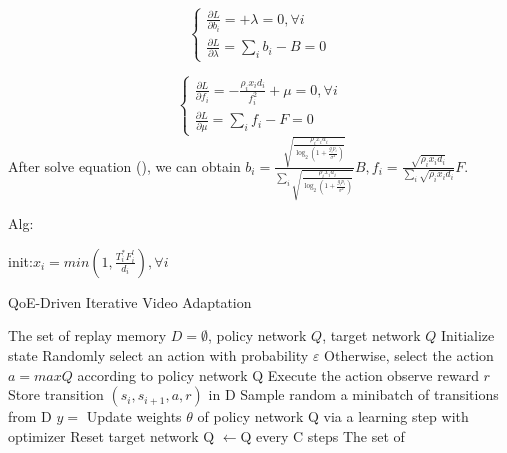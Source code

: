 \documentclass{article}
\begin{document}
\begin{equation}
	\left\{
	\begin{array}{ll}   
	\frac{\partial L}{\partial b_{i}} =  + \lambda = 0, \forall i \\
    \frac{\partial L}{\partial \lambda} = \sum_{i}b_{i} - B = 0
	\end{array}
\right.
\end{equation}

\begin{equation}
	\left\{
	\begin{array}{ll}   
	\frac{\partial L}{\partial f_{i}} = -\frac{\rho_{i}x_{i}d_{i}}{f_{i}^{2}} + \mu = 0, \forall i \\
    \frac{\partial L}{\partial \mu} = \sum_{i}f_{i} - F = 0
	\end{array}
\right.
\end{equation}
After solve equation (), we can obtain $b_{i}=\frac{\sqrt{\frac{\rho_{i}x_{i}a_{i}}{\log_{2}{ (1+\frac{g_{i}p_{i}}{ \sigma^{2} } )} }}}{\sum_{i}\sqrt{\frac{\rho_{i}x_{i}a_{i}}{\log_{2}{ (1+\frac{g_{i}p_{i}}{ \sigma^{2} } )} }}}B, f_{i}=\frac{ \sqrt{ \rho_{i}x_{i}d_{i}} } { \sum_{i}\sqrt{\rho_{i}x_{i}d_{i}} }F$.

Alg:

init:$x_{i}= min(1,\frac{T^{*}_{i}F_{i}^{l}}{d_{i}}), \forall i$

\begin{algorithm}[t]
  \renewcommand{\algorithmicrequire}{\textbf{Input:}}
  \renewcommand{\algorithmicensure}{\textbf{Initialization:}}
  \small
  \caption{QoE-Driven Iterative Video Adaptation}
  \label{alg:intra_place}
  \begin{algorithmic}[1]
  	\REQUIRE The set of
  	\ENSURE replay memory $D=\emptyset$, policy network $Q$, target network $Q$
  		\STATE Initialize state
  			\STATE Randomly select an action with probability $\varepsilon$
  			\STATE Otherwise, select the action $a=maxQ$ according to policy network Q
  			\STATE Execute the action observe reward $r$
  			\STATE Store transition $(s_{i},s_{i+1}, a, r)$ in D
  			\STATE Sample random a minibatch of transitions from D
  			\STATE $y=$
  			\STATE Update weights $\theta$ of policy network Q via a learning step with optimizer
  			\STATE Reset target network Q $\leftarrow$Q every C steps
  		\ENDWHILE
  	\ENDFOR
  	\renewcommand{\algorithmicensure}{\textbf{Output:}}
	\ENSURE The set of
  \end{algorithmic}
\end{algorithm}
\end{document}
